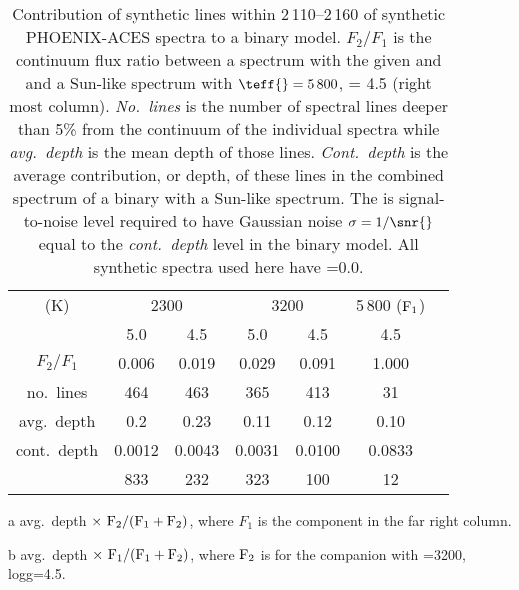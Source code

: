 
\begin{table}
    \small
    \centering
    \begin{threeparttable}[b]
        \caption[Analysis of spectral line depths.]{Contribution of synthetic lines within 2\,110--2\,160\nm{} of synthetic {PHOENIX-ACES} spectra to a binary model. \(F_{2}/F_{1}\) is the continuum flux ratio between a spectrum with the given \txteff{} and \logg{} and a Sun-like spectrum with \(\teff{}=5\,800\),\logg{} = 4.5 (right most column). \emph{No.\ lines} is the number of spectral lines deeper than 5\% from the continuum of the individual spectra while \emph{avg.\ depth} is the mean depth of those lines. \emph{Cont.\ depth} is the average contribution, or depth, of these lines in the combined spectrum of a binary with a Sun-like spectrum. The \snr{} is signal-to-noise level required to have Gaussian noise \(\sigma=1/\snr{}\)  equal to the \emph{cont.\ depth} level in the binary model. All synthetic spectra used here have \feh{}=0.0.}
        \begin{tabular}{*7c}
            \toprule
            \teff{} (K)  & \multicolumn{2}{c}{2300} & \multicolumn{2}{c}{3200} & 5\,800 (\(\rm F_1\))\\
           \logg{} & 5.0 & 4.5  & 5.0 & 4.5 & 4.5 \\
            \midrule
            \(F_2/F_1\) & 0.006 & 0.019 & 0.029  & 0.091 & 1.000 \\
            no.\ lines & 464 & 463 & 365  & 413 & 31 \\
            avg.\ depth & 0.2  & 0.23 & 0.11 & 0.12 & 0.10 \\
            cont.\ depth\tnote{a} &  0.0012 & 0.0043 &  0.0031 & 0.0100 &  0.0833\tnote{b} \\
            \snr{}  & 833 & 232 & 323  & 100 & 12 \\
            \bottomrule
        \end{tabular}\label{tab:line_contributions}
        \begin{tablenotes}
            \item [a] avg.\ depth \(\times~ \rm F_2 / (F_1 + F_2)\), where \(F_1\) is the component in the far right column.
            \item[b] avg.\ depth \(\times~ \rm F_1 / (F_1 + F_2)\), where \(\rm F_2\) is for the companion with \teff{}=3200, logg=4.5.
        \end{tablenotes}
    \end{threeparttable}
\end{table}
